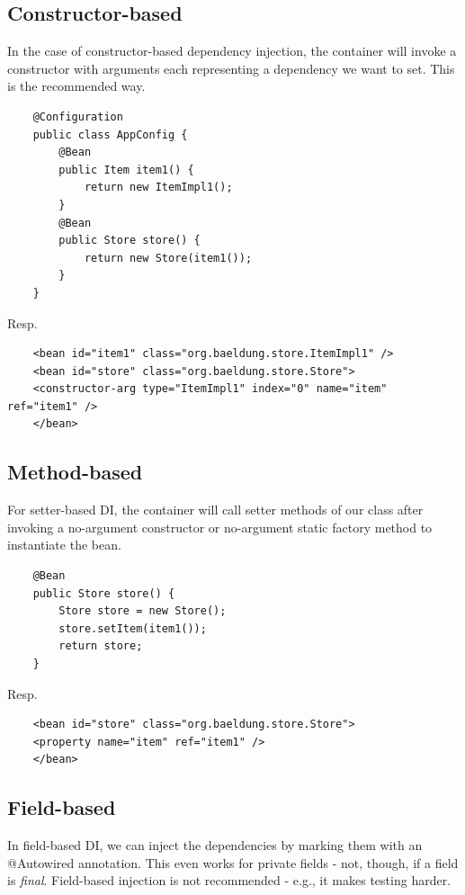 \documentclass{scrartcl}
\begin{document}
\subsection{Constructor-based}

In the case of constructor-based dependency injection, the container will invoke a constructor with arguments each representing a dependency we want to set.
This is the recommended way.

\begin{lstlisting}
    @Configuration
    public class AppConfig {
        @Bean
        public Item item1() {
            return new ItemImpl1();
        }
        @Bean
        public Store store() {
            return new Store(item1());
        }
    }
\end{lstlisting}

Resp.

\begin{lstlisting}
    <bean id="item1" class="org.baeldung.store.ItemImpl1" />
    <bean id="store" class="org.baeldung.store.Store">
    <constructor-arg type="ItemImpl1" index="0" name="item" ref="item1" />
    </bean>
\end{lstlisting}

\subsection{Method-based}

For setter-based DI, the container will call setter methods of our class after invoking a no-argument constructor or no-argument static factory method to instantiate the bean.

\begin{lstlisting}
    @Bean
    public Store store() {
        Store store = new Store();
        store.setItem(item1());
        return store;
    }
\end{lstlisting}

Resp.

\begin{lstlisting}
    <bean id="store" class="org.baeldung.store.Store">
    <property name="item" ref="item1" />
    </bean>
\end{lstlisting}

\subsection{Field-based}

In field-based DI, we can inject the dependencies by marking them with an @Autowired annotation. This even works for private fields - not, though, if a field is \textit{final}.
Field-based injection is not recommended - e.g., it makes testing harder.
\end{document}
